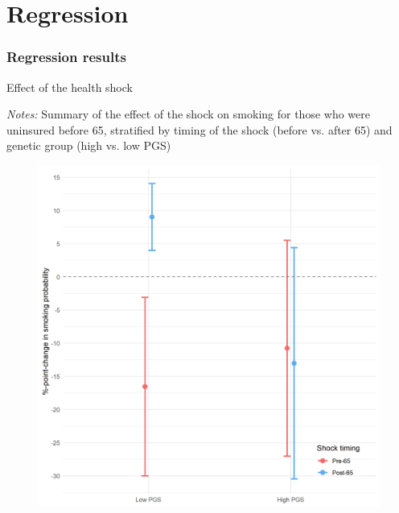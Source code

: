 \documentclass[10pt,compress,xcolor=dvipsnames]{beamer}    %
\begin{document}
\section{Regression}
\begin{frame}
\frametitle{Regression results}

\hspace{-5ex}
\begin{minipage}{.49\textwidth}
	\begin{table}[ht]
		\caption{Effect of the health shock} %
		\small\resizebox{0.65\textheight}{!}{
		
		}

		\vspace{1ex}

		{\raggedright \tiny \textit{Notes:} Summary of the effect of the shock on smoking for those who were uninsured before 65, stratified by timing of the shock (before vs. after 65) and genetic group (high vs. low PGS) \par}
	\end{table}
\end{minipage}
%
\hspace{4ex}
%
\begin{minipage}{.49\textwidth}
	\vspace{5ex}
	\begin{figure}[hbtp]
	\centering
	\includegraphics[height=0.65\textheight]{../../3_output/shock_effects/main_6070_100_cvplot.png}
	\label{fig:maincoeffplot}
	\end{figure}
\end{minipage}

\end{frame}
\end{document}
